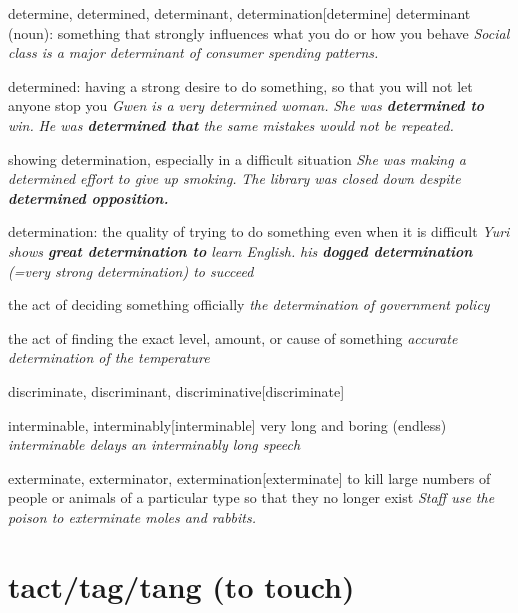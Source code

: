 \begin{DefWord}{determine, determined, determinant, determination}[determine]
    determinant (noun):  something that strongly influences what you do or how you behave
    \textit{Social class is a major determinant of consumer spending patterns.}

    determined: having a strong desire to do something, so that you will not let anyone stop you
    \textit{Gwen is a very determined woman.}
    \textit{She was \textbf{determined to} win.}
    \textit{He was \textbf{determined that} the same mistakes would not be repeated.}

    showing determination, especially in a difficult situation
    \textit{She was making a determined effort to give up smoking.}
    \textit{The library was closed down despite \textbf{determined opposition.}}

    determination: the quality of trying to do something even when it is difficult
    \textit{Yuri shows \textbf{great determination to} learn English.}
    \textit{his \textbf{dogged determination} (=very strong determination) to succeed}

    the act of deciding something officially
    \textit{the determination of government policy}

    the act of finding the exact level, amount, or cause of something
    \textit{accurate determination of the temperature}
\end{DefWord}

\begin{remark}
    \begin{RefWord}{discriminate, discriminant, discriminative}[discriminate]
\end{RefWord}
\end{remark}


\begin{DefWord}{interminable, interminably}[interminable]
    very long and boring (endless)
    \textit{interminable delays}
    \textit{an interminably long speech}
\end{DefWord}

\begin{DefWord}{exterminate, exterminator, extermination}[exterminate]
    to kill large numbers of people or animals of a particular type so that they no longer exist
    \textit{Staff use the poison to exterminate moles and rabbits.}


\end{DefWord}


\section{tact/tag/tang (to touch)}

